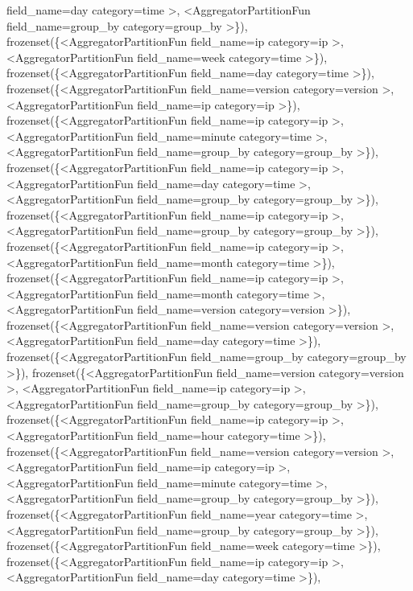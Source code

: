 \documentclass[letterpaper,10pt,english]{sphinxmanual}
\begin{document}
\begin{fulllineitems}
\begin{fulllineitems}
field\_name=day category=time \textgreater{}, \textless{}AggregatorPartitionFun field\_name=group\_by category=group\_by \textgreater{}\}), frozenset(\{\textless{}AggregatorPartitionFun field\_name=ip category=ip \textgreater{}, \textless{}AggregatorPartitionFun field\_name=week category=time \textgreater{}\}), frozenset(\{\textless{}AggregatorPartitionFun field\_name=day category=time \textgreater{}\}), frozenset(\{\textless{}AggregatorPartitionFun field\_name=version category=version \textgreater{}, \textless{}AggregatorPartitionFun field\_name=ip category=ip \textgreater{}\}), frozenset(\{\textless{}AggregatorPartitionFun field\_name=ip category=ip \textgreater{}, \textless{}AggregatorPartitionFun field\_name=minute category=time \textgreater{}, \textless{}AggregatorPartitionFun field\_name=group\_by category=group\_by \textgreater{}\}), frozenset(\{\textless{}AggregatorPartitionFun field\_name=ip category=ip \textgreater{}, \textless{}AggregatorPartitionFun field\_name=day category=time \textgreater{}, \textless{}AggregatorPartitionFun field\_name=group\_by category=group\_by \textgreater{}\}), frozenset(\{\textless{}AggregatorPartitionFun field\_name=ip category=ip \textgreater{}, \textless{}AggregatorPartitionFun field\_name=group\_by category=group\_by \textgreater{}\}), frozenset(\{\textless{}AggregatorPartitionFun field\_name=ip category=ip \textgreater{}, \textless{}AggregatorPartitionFun field\_name=month category=time \textgreater{}\}), frozenset(\{\textless{}AggregatorPartitionFun field\_name=ip category=ip \textgreater{}, \textless{}AggregatorPartitionFun field\_name=month category=time \textgreater{}, \textless{}AggregatorPartitionFun field\_name=version category=version \textgreater{}\}), frozenset(\{\textless{}AggregatorPartitionFun field\_name=version category=version \textgreater{}, \textless{}AggregatorPartitionFun field\_name=day category=time \textgreater{}\}), frozenset(\{\textless{}AggregatorPartitionFun field\_name=group\_by category=group\_by \textgreater{}\}), frozenset(\{\textless{}AggregatorPartitionFun field\_name=version category=version \textgreater{}, \textless{}AggregatorPartitionFun field\_name=ip category=ip \textgreater{}, \textless{}AggregatorPartitionFun field\_name=group\_by category=group\_by \textgreater{}\}), frozenset(\{\textless{}AggregatorPartitionFun field\_name=ip category=ip \textgreater{}, \textless{}AggregatorPartitionFun field\_name=hour category=time \textgreater{}\}), frozenset(\{\textless{}AggregatorPartitionFun field\_name=version category=version \textgreater{}, \textless{}AggregatorPartitionFun field\_name=ip category=ip \textgreater{}, \textless{}AggregatorPartitionFun field\_name=minute category=time \textgreater{}, \textless{}AggregatorPartitionFun field\_name=group\_by category=group\_by \textgreater{}\}), frozenset(\{\textless{}AggregatorPartitionFun field\_name=year category=time \textgreater{}, \textless{}AggregatorPartitionFun field\_name=group\_by category=group\_by \textgreater{}\}), frozenset(\{\textless{}AggregatorPartitionFun field\_name=week category=time \textgreater{}\}), frozenset(\{\textless{}AggregatorPartitionFun field\_name=ip category=ip \textgreater{}, \textless{}AggregatorPartitionFun field\_name=day category=time \textgreater{}\}), 
\end{fulllineitems}
\end{fulllineitems}
\end{document}
